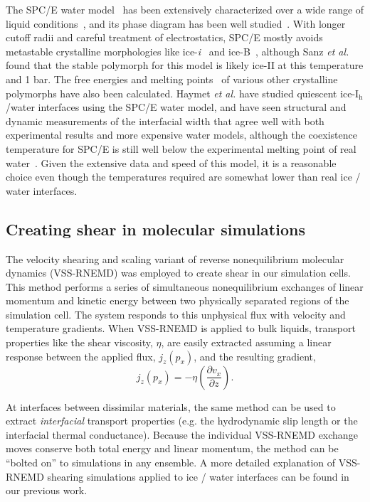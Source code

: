\documentclass[journal = jpccck, manuscript = article]{achemso}
\begin{document}
The SPC/E water model~\cite{Berendsen1987} has been extensively
characterized over a wide range of liquid
conditions~\cite{Arbuckle2002,Kuang2012}, and its phase diagram has
been well studied~\cite{Baez1995,Bryk2004,Sanz2004a,Fennell2005}. With
longer cutoff radii and careful treatment of electrostatics, SPC/E
mostly avoids metastable crystalline morphologies like
ice-\textit{i}~\cite{Fennell2005} and ice-B~\cite{Baez1995}, although
Sanz \textit{et al.} found that the stable polymorph for this model is
likely ice-II at this temperature and 1 bar.\cite{Sanz2004a}  The free energies and
melting
points~\cite{Baez1995,Arbuckle2002,Gay2002,Bryk2002,Bryk2004,Sanz2004a,Fennell2005,GarciaFernandez2006,Abascal2007,Vrbka2007}
of various other crystalline polymorphs have also been calculated.
Haymet \textit{et al.} have studied quiescent ice-I$_\mathrm{h}$/water
interfaces using the SPC/E water model, and have seen structural and
dynamic measurements of the interfacial width that agree well with
both experimental results and more expensive water models, although
the coexistence temperature for SPC/E is still well below the
experimental melting point of real water~\cite{Bryk2002}. Given the
extensive data and speed of this model, it is a reasonable choice even
though the temperatures required are somewhat lower than real ice /
water interfaces.

\subsection{Creating shear in molecular simulations}
The velocity shearing and scaling variant of reverse nonequilibrium
molecular dynamics (VSS-RNEMD)\cite{Kuang2012} was employed to create
shear in our simulation cells. This method performs a series of
simultaneous nonequilibrium exchanges of linear momentum and kinetic
energy between two physically separated regions of the simulation
cell. The system responds to this unphysical flux with velocity and
temperature gradients. When VSS-RNEMD is applied to bulk liquids,
transport properties like the shear viscosity, $\eta$, are easily
extracted assuming a linear response between the applied flux,
$j_z(p_x)$, and the resulting gradient,
\begin{equation}
j_z(p_x) = -\eta \left(\frac{\partial v_x}{\partial z}\right).
\end{equation}

At interfaces between dissimilar materials, the same method can be
used to extract \textit{interfacial} transport properties (e.g. the
hydrodynamic slip length or the interfacial thermal
conductance). Because the individual VSS-RNEMD exchange moves conserve
both total energy and linear momentum, the method can be ``bolted on''
to simulations in any ensemble.  A more detailed explanation of
VSS-RNEMD shearing simulations applied to ice / water interfaces can
be found in our previous work.\cite{Louden2013}
\end{document}
